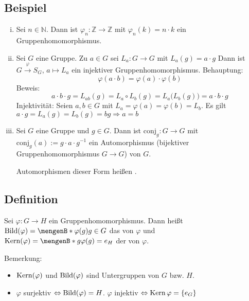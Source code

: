 \subsection[Beispiele für Gruppenhomomorphismen]{Beispiel} %
\label{sub:111}
\begin{enumerate}[(i)]
	\item Sei $n \in \mathds{N}$. Dann ist $\varphi_n : \mathds{Z} \to \mathds{Z}$ mit $\varphi_n(k)= n \cdot k$ ein Gruppenhomomorphismus. 
	\item Sei $G$ eine Gruppe. Zu $a \in G$ sei $L_a : G \to G$ mit $L_a(g) = a \cdot g$ 
	Dann ist $G \xrightarrow{\varphi}  S_G$, $a \mapsto L_a$ ein injektiver Gruppenhomomorphismus. Behauptung:
	\[
		\varphi(a \cdot b) = \varphi(a) \cdot \varphi(b)
	\]
	Beweis:
	\[
		a \cdot b \cdot g =L_{ab} (g) = L_a \circ L_b (g) = L_a \big( L_b(g)\big) = a \cdot b \cdot g
	\]
	Injektivität: Seien $a,b \in G$ mit $L_a = \varphi(a) = \varphi(b) = L_b$. Es gilt $a \cdot g = L_a (g) = L_b (g) = b g \Rightarrow  a = b$
	\item Sei $G$ eine Gruppe und $g \in G$. Dann ist $\mathrm{conj}_g : G \to G$ mit $\mathrm{conj}_g (a) := g \cdot a \cdot g ^{-1}$ ein Automorphismus (bijektiver
	Gruppenhomomorphismus $G \to G$) von $G$.
	
	Automorphismen dieser Form heißen  .
\end{enumerate}

\subsection[Definition: Bild und Kern eines Gruppenhomomorphismus]{Definition} %
\label{sub:112}
Sei $\varphi : G \to H$ ein Gruppenhomomorphismus. Dann heißt $\bild (\varphi) = \set[\varphi(g)]{g \in G} $ das  von $\varphi$ und 
$\Kern(\varphi) = \set[g]{\varphi(g) = e_H} $ der  von $\varphi$.

Bemerkung: \begin{itemize}
	\item $\operatorname{Kern} (\varphi)$ und $\operatorname{Bild} ( \varphi)$ sind Untergruppen von $G$ bzw. $H$.
	\item $\varphi$ surjektiv $\Leftrightarrow \operatorname{Bild} (\varphi) = H$. $\varphi$ injektiv $\Leftrightarrow \operatorname{Kern} \varphi = \{ e_G\}$
\end{itemize}

